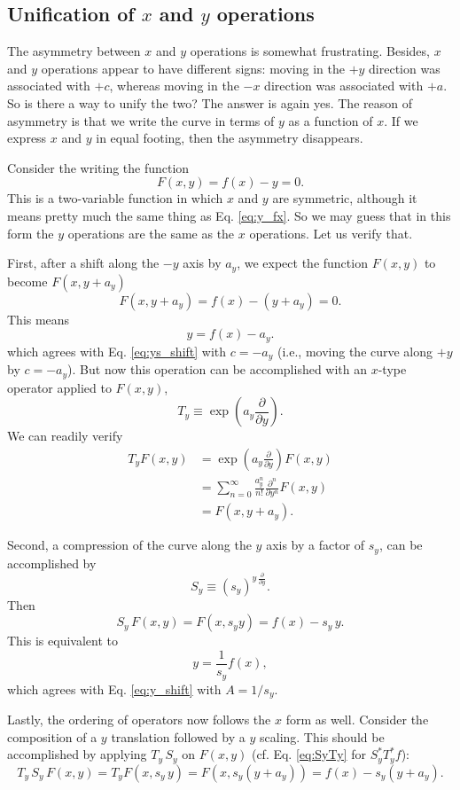 \documentclass{article}
\begin{document}
\subsection{Unification of $x$ and $y$ operations}

The asymmetry between $x$ and $y$ operations
is somewhat frustrating.
%
Besides, $x$ and $y$
operations appear to have different signs:
moving in the $+y$ direction was associated with $+c$,
whereas moving in the $-x$ direction was associated with $+a$.
So is there a way to unify the two?
The answer is again yes.
The reason of asymmetry is that
we write the curve in terms of $y$ as a function of $x$.
%
If we express $x$ and $y$ in equal footing,
then the asymmetry disappears.

Consider the writing the function
$$
F(x, y) = f(x) - y = 0.
$$
This is a two-variable function
in which $x$ and $y$ are symmetric,
although it means pretty much the same thing as
Eq. \eqref{eq:y_fx}.
So we may guess that in this form
the $y$ operations are the same as the $x$ operations.
Let us verify that.

First, after a shift along the $-y$ axis by $a_y$, we expect
the function $F(x, y)$ to become $F(x, y + a_y)$
$$
F(x, y + a_y) = f(x) - (y + a_y) = 0.
$$
This means
$$
  y = f(x) - a_y.
$$
which agrees with Eq. \eqref{eq:ys_shift} with $c = - a_y$
(i.e., moving the curve along $+y$ by $c = -a_y$).
But now this operation can be accomplished with an $x$-type
operator applied to $F(x, y)$,
\begin{equation}
  T_y \equiv
  \exp\left(a_y \frac{ \partial } { \partial y } \right).
  \label{eq:y_shift}
\end{equation}
We can readily verify
$$
\begin{aligned}
T_y F(x, y)
&= \exp\left(a_y \frac{ \partial } { \partial y } \right) F(x, y) \\
&= \sum_{n = 0}^\infty \frac{ a_y^n }{n!}
\frac{ \partial^n } {\partial y^n} F(x, y) \\
&= F(x, y + a_y).
\end{aligned}
$$


Second,
a compression of the curve
along the $y$ axis by a factor of $s_y$,
can be accomplished by
\begin{equation}
  S_y \equiv
  (s_y)^{ y \, \frac{ \partial } { \partial y } }.
  \label{eq:y_scale}
\end{equation}
Then
$$
S_y \, F(x, y)
=
F(x, s_y y)
= f(x) - s_y \, y.
$$
This is equivalent to
$$
y = \frac{1}{s_y} f(x),
$$
which agrees with Eq. \eqref{eq:y_shift} with $A = 1/s_y$.


Lastly, the ordering of operators now follows
the $x$ form as well.
Consider the composition of a $y$ translation
followed by a $y$ scaling.
This should be accomplished by applying $T_y \, S_y$ on $F(x, y)$
(cf. Eq. \eqref{eq:SyTy} for $S_y^* T_y^* f$):
$$
T_y \, S_y \, F(x, y)
= T_y F(x, s_y \, y)
= F(x, s_y (y + a_y))
= f(x) - s_y (y + a_y).
$$
\end{document}
